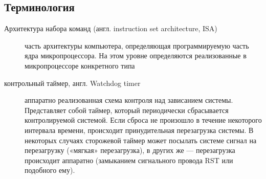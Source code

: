 \subsection{Терминология}
\begin{description}

\item[Архитектура набора команд (англ. instruction set architecture, ISA)]
часть архитектуры компьютера, определяющая программируемую часть ядра микропроцессора. На этом уровне определяются реализованные в микропроцессоре конкретного типа

\item[контрольный таймер, англ. Watchdog timer]
аппаратно реализованная схема контроля над зависанием системы. Представляет собой таймер, который периодически сбрасывается контролируемой системой. Если сброса не произошло в течение некоторого интервала времени, происходит принудительная перезагрузка системы. В некоторых случаях сторожевой таймер может посылать системе сигнал на перезагрузку («мягкая» перезагрузка), в других же — перезагрузка происходит аппаратно (замыканием сигнального провода RST или подобного ему).


\end{description}

